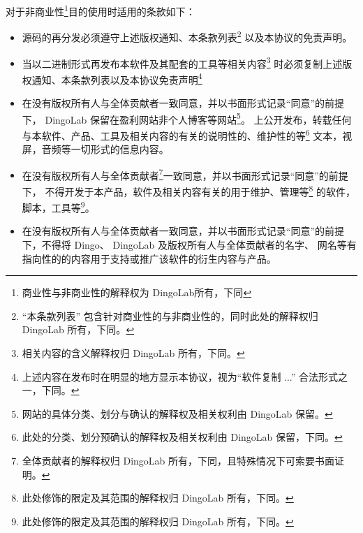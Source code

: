   对于非商业性\footnote{商业性与非商业性的解释权为 DingoLab所有，下同}目的使用时适用的条款如下：
  \begin{itemize}
    \item 源码的再分发必须遵守上述版权通知、本条款列表\footnote{“本条款列表” 包含针对商业性的与非商业性的，同时此处的解释权归 DingoLab 所有，下同。}
      以及本协议的免责声明。
    \item 当以二进制形式再发布本软件及其配套的工具等相关内容\footnote{相关内容的含义解释权归 DingoLab 所有，下同。}
      时必须复制上述版权通知、本条款列表以及本协议免责声明\footnote{上述内容在发布时在明显的地方显示本协议，视为“软件复制 ...” 合法形式之一，下同。}
    \item 在没有版权所有人与全体贡献者一致同意，并以书面形式记录“同意”的前提下，
      DingoLab 保留在盈利网站非个人博客等网站\footnote{网站的具体分类、划分与确认的解释权及相关权利由 DingoLab 保留。}。
      上公开发布，转载任何与本软件、产品、工具及相关内容的有关的说明性的、维护性的等\footnote{此处的分类、划分预确认的解释权及相关权利由 DingoLab 保留，下同。}
      文本，视屏，音频等一切形式的信息内容。
    \item 在没有版权所有人与全体贡献者\footnote{全体贡献者的解释权归 DingoLab 所有，下同，且特殊情况下可索要书面证明。}一致同意，并以书面形式记录“同意”的前提下，
      不得开发于本产品，软件及相关内容有关的用于维护、管理等\footnote{此处修饰的限定及其范围的解释权归 DingoLab 所有，下同。}
      的软件，脚本，工具等\footnote{此处修饰的限定及其范围的解释权归 DingoLab 所有，下同。}。
    \item 在没有版权所有人与全体贡献者一致同意，并以书面形式记录“同意”的前提下，不得将 Dingo、 DingoLab 及版权所有人与全体贡献者的名字、
      网名等有指向性的的内容用于支持或推广该软件的衍生内容与产品。
  \end{itemize}

